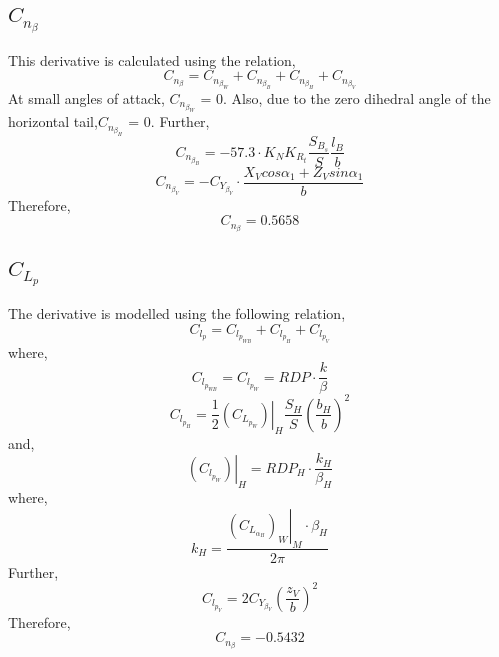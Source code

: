 \documentclass[letterpaper,12pt]{article}
\begin{document}
\subsection{$C_{n_{\beta}}$}
This derivative is calculated using the relation,
\begin{equation*}
C_{n_{\beta}} = C_{n_{\beta_W}} + C_{n_{\beta_B}} + C_{n_{\beta_H}} + C_{n_{\beta_V}}
\end{equation*}
At small angles of attack, $C_{n_{\beta_W}}$ = 0. Also, due to the zero dihedral angle of the horizontal tail,$C_{n_{\beta_H}}$ = 0. Further,
\begin{equation*}
C_{n_{\beta_B}} = -57.3\cdot K_N K_{R_t}\frac{S_{B_s}}{S}\frac{l_B}{b}
\end{equation*}
\begin{equation*}
C_{n_{\beta_V}} = -C_{Y_{\beta_V}}\cdot\frac{X_V cos\alpha_1 + Z_V sin\alpha_1}{b}
\end{equation*}
Therefore,
\begin{equation*}
C_{n_{\beta}} = 0.5658
\end{equation*}
\subsection{$C_{L_p}$}
The derivative is modelled using the following relation,
\begin{equation*}
C_{l_p} = C_{l_{p_{WB}}} + C_{l_{p_H}} + C_{l_{p_V}}
\end{equation*}
where,
\begin{equation*}
C_{l_{p_{WB}}} = C_{l_{p_{W}}} = RDP\cdot\frac{k}{\beta}
\end{equation*}
\begin{equation*}
C_{l_{p_{H}}} = \frac{1}{2}\left.\left(C_{L_{p_W}}\right)\right\vert_{H} \frac{S_H}{S} \left(\frac{b_H}{b}\right)^2
\end{equation*}
and,
\begin{equation*}
\left.\left(C_{l_{p_W}}\right)\right\vert_{H} = RDP_H \cdot\frac{k_H}{\beta_H}
\end{equation*}
where,
\begin{equation*}
k_H = \frac{\left.\left(C_{L_{\alpha_H}}\right)_W\right\vert_M\cdot\beta_H}{2\pi}
\end{equation*}
Further,
\begin{equation*}
C_{l_{p_V}} = 2 C_{Y_{\beta_V}}\left(\frac{z_V}{b}\right)^2
\end{equation*}
Therefore,
\begin{equation*}
C_{n_{\beta}} = -0.5432
\end{equation*}
\end{document}
